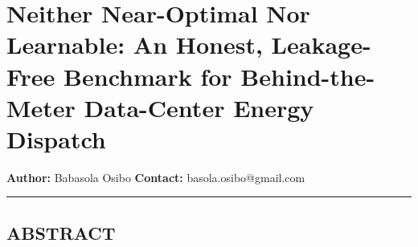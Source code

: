 \documentclass[
  11pt,
]{article}
\author{}
\date{}
\begin{document}
\section{Neither Near-Optimal Nor Learnable: An Honest, Leakage-Free
Benchmark for Behind-the-Meter Data-Center Energy
Dispatch}\label{neither-near-optimal-nor-learnable-an-honest-leakage-free-benchmark-for-behind-the-meter-data-center-energy-dispatch}

\textbf{Author:} Babasola Osibo \textbf{Contact:} basola.osibo@gmail.com

\begin{center}\rule{0.5\linewidth}{0.5pt}\end{center}

\subsection{ABSTRACT}\label{abstract}
\end{document}
